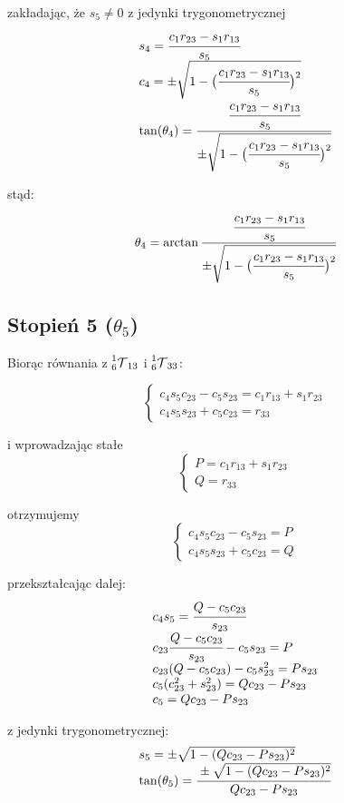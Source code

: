 \documentclass[]{article}
\newcommand\T{\mathcal{T}}
\begin{document}
zakładając, że $s_5 \neq 0$ z jedynki trygonometrycznej
\[\begin{array}{l}
s_4 = \cfrac{c_1r_{23} - s_1r_{13}}{s_5} \\
c_4 = \pm \sqrt{1 - \big(\cfrac{c_1r_{23} - s_1r_{13}}{s_5}\big)^2} \\
\tan(\theta_4) = \cfrac{\cfrac{c_1r_{23} - s_1r_{13}}{s_5}}{\pm \sqrt{1 - \big(\cfrac{c_1r_{23} - s_1r_{13}}{s_5}\big)^2}}
\end{array}\]

stąd:
\[
\theta_4 = \arctan\cfrac{\cfrac{c_1r_{23} - s_1r_{13}}{s_5}}{\pm \sqrt{1 - \big(\cfrac{c_1r_{23} - s_1r_{13}}{s_5}\big)^2}}
\]

\subsection{Stopień 5 ($\theta_5$)}
Biorąc równania z $\prescript{1}{6}{\T}_{13}$ i $\prescript{1}{6}{\T}_{33}$:

\[\left\{\begin{array}{l}
c_4s_5c_{23} - c_5s_{23} = c_1r_{13} + s_1r_{23} \\
c_4s_5s_{23} + c_5c_{23} = r_{33}
\end{array}\right.\]

i wprowadzając stałe
\[\left\{\begin{array}{l}
P = c_1r_{13} + s_1r_{23} \\
Q = r_{33}
\end{array}\right.\]

otrzymujemy
\[\left\{\begin{array}{l}
c_4s_5c_{23} - c_5s_{23} = P \\
c_4s_5s_{23} + c_5c_{23} = Q
\end{array}\right.\]

przekształcając dalej:
\[\begin{array}{l}
c_4s_5 = \cfrac{Q - c_5c_{23}}{s_{23}} \\
c_{23}\cfrac{Q - c_5c_{23}}{s_{23}} - c_5s_{23} = P \\
c_{23}(Q - c_5c_{23}) - c_5s_{23}^2 = Ps_{23} \\
c_5(c_{23}^2 + s_{23}^2) = Qc_{23} - Ps_{23} \\
c_5 = Qc_{23} - Ps_{23}
\end{array}\]

z jedynki trygonometrycznej:
\[\begin{array}{l}
s_5 = \pm \sqrt{1 - (Qc_{23} - Ps_{23})^2} \\
\tan(\theta_5) = \cfrac{\pm \sqrt{1 - (Qc_{23} - Ps_{23})^2}}{Qc_{23} - Ps_{23}}
\end{array}\]
\end{document}

